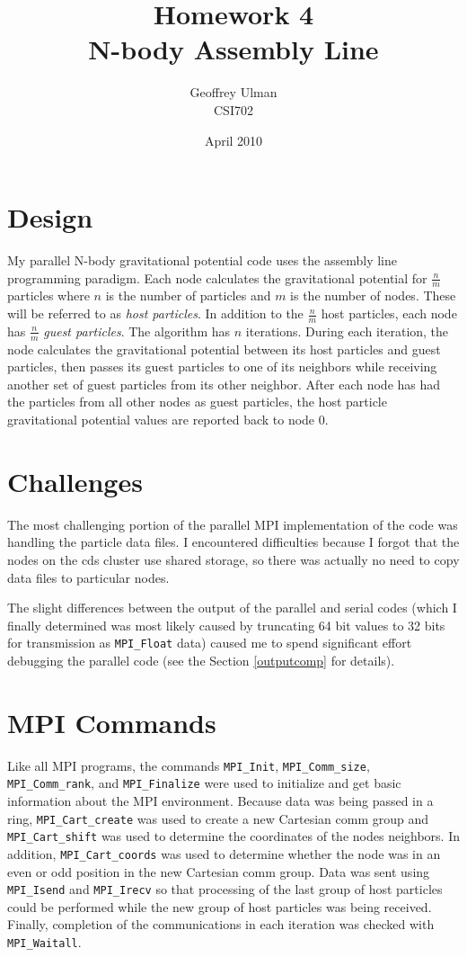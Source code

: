 \documentclass{article}
\begin{document}
\title{Homework 4\\
       N-body Assembly Line}
\author{Geoffrey Ulman\\
        CSI702}
\date{April 2010}
\maketitle

\section{Design}
My parallel N-body gravitational potential code uses the assembly line programming paradigm. Each node calculates the gravitational potential for \( \frac{n}{m} \) particles where \( n \) is the number of particles and \( m \) is the number of nodes. These will be referred to as \emph{host particles}. In addition to the \( \frac{n}{m} \) host particles, each node has \( \frac{n}{m} \) \emph{guest particles}. The algorithm has \( n \) iterations.
During each iteration, the node calculates the gravitational potential between its host particles and guest particles, then passes its guest particles to one of its neighbors while receiving another set of guest particles from its other neighbor. After each node has had the particles from all other nodes as guest particles, the host particle gravitational potential values are reported back to node 0.

\section{Challenges}
The most challenging portion of the parallel MPI implementation of the code was handling the particle data files. I encountered difficulties because I forgot that the nodes on the cds cluster use shared storage, so there was actually no need to copy data files to particular nodes.

The slight differences between the output of the parallel and serial codes (which I finally determined was most likely caused by truncating 64 bit values to 32 bits for transmission as \verb!MPI_Float! data) caused me to spend significant effort debugging the parallel code (see the Section \ref{outputcomp} for details).

\section{MPI Commands}
Like all MPI programs, the commands \verb!MPI_Init!, \verb!MPI_Comm_size!, \verb!MPI_Comm_rank!, and \verb!MPI_Finalize! were used to initialize and get basic information about the MPI environment. Because data was being passed in a ring, \verb!MPI_Cart_create! was used to create a new Cartesian comm group and \verb!MPI_Cart_shift! was used to determine the coordinates of the nodes neighbors. In addition, \verb!MPI_Cart_coords! was used to determine whether the node was in an even or odd position in the new Cartesian comm group. Data was sent using \verb!MPI_Isend! and \verb!MPI_Irecv! so that processing of the last group of host particles could be performed while the new group of host particles was being received. Finally, completion of the communications in each iteration was checked with \verb!MPI_Waitall!.
\end{document}
